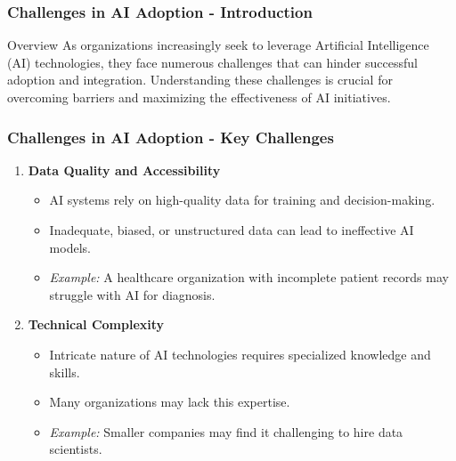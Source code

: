 \documentclass{beamer}
\begin{document}
\begin{frame}[fragile]
    \frametitle{Challenges in AI Adoption - Introduction}
    \begin{block}{Overview}
        As organizations increasingly seek to leverage Artificial Intelligence (AI) technologies, they face numerous challenges that can hinder successful adoption and integration.
        Understanding these challenges is crucial for overcoming barriers and maximizing the effectiveness of AI initiatives.
    \end{block}
\end{frame}

\begin{frame}[fragile]
    \frametitle{Challenges in AI Adoption - Key Challenges}
    \begin{enumerate}
        \item \textbf{Data Quality and Accessibility}
        \begin{itemize}
            \item AI systems rely on high-quality data for training and decision-making.
            \item Inadequate, biased, or unstructured data can lead to ineffective AI models.
            \item \textit{Example:} A healthcare organization with incomplete patient records may struggle with AI for diagnosis.
        \end{itemize}

        \item \textbf{Technical Complexity}
        \begin{itemize}
            \item Intricate nature of AI technologies requires specialized knowledge and skills.
            \item Many organizations may lack this expertise.
            \item \textit{Example:} Smaller companies may find it challenging to hire data scientists.
        \end{itemize}
    \end{enumerate}
\end{frame}
\end{document}
